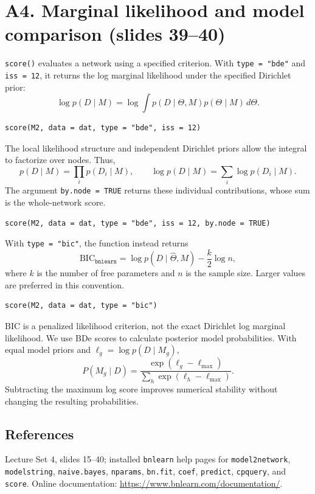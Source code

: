 \documentclass[11pt]{article}
\newcommand{\code}[1]{\texttt{#1}}
\begin{document}
\section*{A4. Marginal likelihood and model comparison
\normalfont\small (slides 39--40)}
\code{score()} evaluates a network using a specified criterion.
With \code{type = "bde"} and \code{iss = 12}, it returns the log marginal
likelihood under the specified Dirichlet prior:
\[
 \log p(D\mid M)
 =\log\int p(D\mid\Theta,M)p(\Theta\mid M)\,d\Theta.
\]
\begin{lstlisting}
score(M2, data = dat, type = "bde", iss = 12)
\end{lstlisting}
The local likelihood structure and independent Dirichlet priors allow the
integral to factorize over nodes. Thus,
\[
 p(D\mid M)=\prod_i p(D_i\mid M),\qquad
 \log p(D\mid M)=\sum_i\log p(D_i\mid M).
\]
The argument \code{by.node = TRUE} returns these individual contributions,
whose sum is the whole-network score.
\begin{lstlisting}
score(M2, data = dat, type = "bde", iss = 12, by.node = TRUE)
\end{lstlisting}
With \code{type = "bic"}, the function instead returns
\[
 \mathrm{BIC}_{\texttt{bnlearn}}
 =\log p(D\mid\widehat\Theta,M)-\frac{k}{2}\log n,
\]
where $k$ is the number of free parameters and $n$ is the sample size.
Larger values are preferred in this convention.
\begin{lstlisting}
score(M2, data = dat, type = "bic")
\end{lstlisting}
BIC is a penalized likelihood criterion, not the exact Dirichlet log
marginal likelihood. We use BDe scores to calculate posterior model
probabilities. With equal model priors and $\ell_g=\log p(D\mid M_g)$,
\[
 P(M_g\mid D)=
 \frac{\exp(\ell_g-\ell_{\max})}
      {\sum_h\exp(\ell_h-\ell_{\max})}.
\]
Subtracting the maximum log score improves numerical stability without
changing the resulting probabilities.

\subsection*{References}
Lecture Set 4, slides 15--40; installed \code{bnlearn} help pages for
\code{model2network}, \code{modelstring}, \code{naive.bayes},
\code{nparams}, \code{bn.fit}, \code{coef}, \code{predict},
\code{cpquery}, and \code{score}. Online documentation:
\url{https://www.bnlearn.com/documentation/}.
\end{document}
